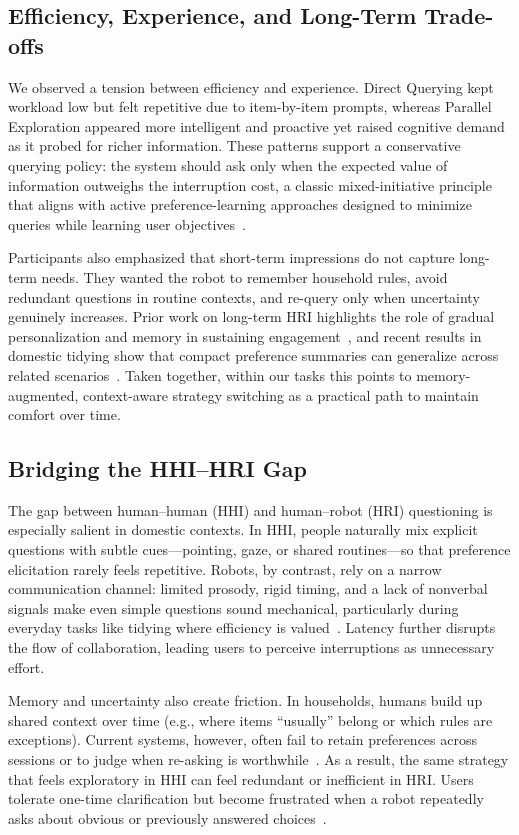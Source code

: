 \documentclass[sigconf,authordraft]{acmart}
\begin{document}
\subsection{Efficiency, Experience, and Long-Term Trade-offs}
We observed a tension between efficiency and experience. Direct Querying kept workload low but felt repetitive due to item-by-item prompts, whereas Parallel Exploration appeared more intelligent and proactive yet raised cognitive demand as it probed for richer information. These patterns support a conservative querying policy: the system should ask only when the expected value of information outweighs the interruption cost, a classic mixed-initiative principle that aligns with active preference-learning approaches designed to minimize queries while learning user objectives~\cite{biyik2019asking}.

Participants also emphasized that short-term impressions do not capture long-term needs. They wanted the robot to remember household rules, avoid redundant questions in routine contexts, and re-query only when uncertainty genuinely increases. Prior work on long-term HRI highlights the role of gradual personalization and memory in sustaining engagement~\cite{matheus2025long}, and recent results in domestic tidying show that compact preference summaries can generalize across related scenarios~\cite{wu2023tidybot}. Taken together, within our tasks this points to memory-augmented, context-aware strategy switching as a practical path to maintain comfort over time.


\subsection{Bridging the HHI–HRI Gap}
 The gap between human–human (HHI) and human–robot (HRI) questioning is especially salient in domestic contexts. In HHI, people naturally mix explicit questions with subtle cues—pointing, gaze, or shared routines—so that preference elicitation rarely feels repetitive. Robots, by contrast, rely on a narrow communication channel: limited prosody, rigid timing, and a lack of nonverbal signals make even simple questions sound mechanical, particularly during everyday tasks like tidying where efficiency is valued~\cite{mutlu2009footing}. Latency further disrupts the flow of collaboration, leading users to perceive interruptions as unnecessary effort.
 
Memory and uncertainty also create friction. In households, humans build up shared context over time (e.g., where items “usually” belong or which rules are exceptions). Current systems, however, often fail to retain preferences across sessions or to judge when re-asking is worthwhile~\cite{leite2013social,ji2023survey}. As a result, the same strategy that feels exploratory in HHI can feel redundant or inefficient in HRI. Users tolerate one-time clarification but become frustrated when a robot repeatedly asks about obvious or previously answered choices~\cite{ahn2022can}.
\end{document}
